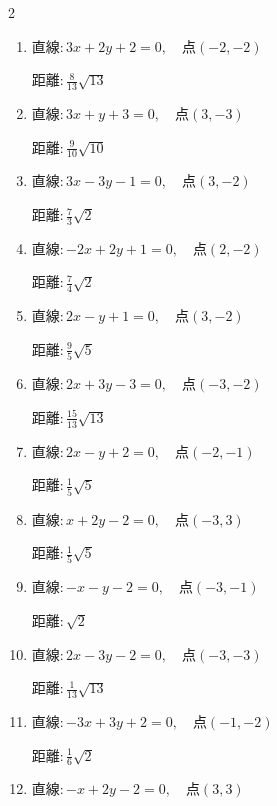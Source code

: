 \begin{multicols}{2}
\begin{enumerate}
        $\displaystyle 距離 : \frac{6}{5}\sqrt{5}$

  \item $直線:3x+2y+2=0,\quad 点 ( -2, -2 )$

        $\displaystyle 距離 : \frac{8}{13}\sqrt{13}$

  \item $直線:3x+y+3=0,\quad 点 ( 3, -3 )$

        $\displaystyle 距離 : \frac{9}{10}\sqrt{10}$

  \item $直線:3x-3y-1=0,\quad 点 ( 3, -2 )$

        $\displaystyle 距離 : \frac{7}{3}\sqrt{2}$

  \item $直線:-2x+2y+1=0,\quad 点 ( 2, -2 )$

        $\displaystyle 距離 : \frac{7}{4}\sqrt{2}$

  \item $直線:2x-y+1=0,\quad 点 ( 3, -2 )$

        $\displaystyle 距離 : \frac{9}{5}\sqrt{5}$

  \item $直線:2x+3y-3=0,\quad 点 ( -3, -2 )$

        $\displaystyle 距離 : \frac{15}{13}\sqrt{13}$

  \item $直線:2x-y+2=0,\quad 点 ( -2, -1 )$

        $\displaystyle 距離 : \frac{1}{5}\sqrt{5}$

  \item $直線:x+2y-2=0,\quad 点 ( -3, 3 )$

        $\displaystyle 距離 : \frac{1}{5}\sqrt{5}$

\columnbreak %

\resetques

  \item $直線:-x-y-2=0,\quad 点 ( -3, -1 )$

        $\displaystyle 距離 : \sqrt{2}$

  \item $直線:2x-3y-2=0,\quad 点 ( -3, -3 )$

        $\displaystyle 距離 : \frac{1}{13}\sqrt{13}$

  \item $直線:-3x+3y+2=0,\quad 点 ( -1, -2 )$

        $\displaystyle 距離 : \frac{1}{6}\sqrt{2}$

  \item $直線:-x+2y-2=0,\quad 点 ( 3, 3 )$


\end{enumerate}
\end{multicols}
